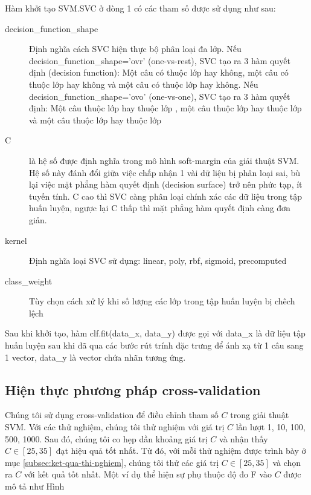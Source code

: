 Hàm khởi tạo SVM.SVC ở dòng 1 có các tham số được sử dụng như sau:
\begin{description}
\item[decision\_function\_shape] Định nghĩa cách SVC hiện thực bộ phân loại đa lớp. Nếu decision\_function\_shape='ovr' (one-vs-rest), SVC tạo ra 3 hàm quyết định (decision function): Một câu có thuộc lớp \tichcuc hay không, một câu có thuộc lớp \tieucuc hay không và một câu có thuộc lớp \trungtinh hay không. Nếu decision\_function\_shape='ovo' (one-vs-one), SVC tạo ra 3 hàm quyết định: Một câu thuộc lớp \tichcuc hay thuộc lớp \tieucuc, một câu thuộc lớp \tieucuc hay thuộc lớp \trungtinh và một câu thuộc lớp \trungtinh hay thuộc lớp \tichcuc
\item[C] là hệ số được định nghĩa trong mô hình soft-margin của giải thuật SVM. Hệ số này đánh đổi giữa việc chấp nhận 1 vài dữ liệu bị phân loại sai, bù lại việc mặt phẳng hàm quyết định (decision surface) trở nên phức tạp, ít tuyến tính. C cao thì SVC càng phân loại chính xác các dữ liệu trong tập huấn luyện, ngược lại C thấp thì mặt phẳng hàm quyết định càng đơn giản.
\item[kernel] Định nghĩa loại  SVC sử dụng: linear, poly, rbf, sigmoid, precomputed
\item[class\_weight] Tùy chọn cách xử lý khi số lượng các lớp trong tập huấn luyện bị chêch lệch
\end{description}

Sau khi khởi tạo, hàm clf.fit(data\_x, data\_y) được gọi với data\_x là dữ liệu tập huấn luyện sau khi đã qua các bước rút trính đặc trưng để ánh xạ từ 1 câu sang 1 vector, data\_y là vector chứa nhãn tương ứng.
\subsection{Hiện thực phương pháp cross-validation}
Chúng tôi sử dụng cross-validation để điều chỉnh tham số $C$ trong giải thuật SVM. Với các thử nghiệm, chúng tôi thử nghiệm với giá trị $C$ lần lượt 1, 10, 100, 500, 1000. Sau đó, chúng tôi co hẹp dần khoảng giá trị $C$ và nhận thấy $C \in [25, 35]$ đạt hiệu quả tốt nhất. Từ đó, với mỗi thử nghiệm được trình bày ở mục \ref{subsec:ket-qua-thi-nghiem}, chúng tôi thử các giá trị $C \in [25, 35]$ và chọn ra $C$ với kết quả tốt nhất. Một ví dụ thể hiện sự phụ thuộc độ đo F vào $C$ được mô tả như Hình \
